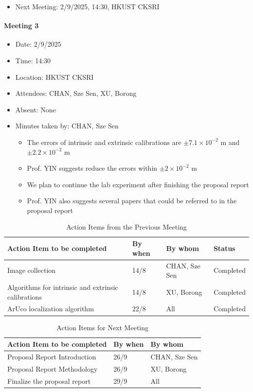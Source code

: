 \documentclass[11pt]{article}
\begin{document}
    \begin{itemize}
        \item Next Meeting: 2/9/2025, 14:30, HKUST CKSRI
    \end{itemize}
    \newpage
    \paragraph{Meeting 3}
    \begin{itemize}
        \item Date: 2/9/2025
        \item Time: 14:30
        \item Location: HKUST CKSRI
        \item Attendees: CHAN, Sze Sen, XU, Borong
        \item Absent: None
        \item Minutes taken by: CHAN, Sze Sen
        \begin{itemize}
            \item The errors of intrinsic and extrinsic calibrations are $\pm 7.1\times 10^ {- 2} $ m and $\pm 2.2\times 10^ {- 2} $ m
            \item Prof. YIN suggests reduce the errors within $\pm2\times 10^ {- 2} $ m
            \item We plan to continue the lab experiment after finishing the proposal report
            \item Prof. YIN also suggests several papers that could be referred to in the proposal report
        \end{itemize}
    \end{itemize}
    \begin{longtable}[c]{| l | l | l | l |}
        \caption{Action Items from the Previous Meeting\label{previous meeting 3}}\\ 
        \hline
        \textbf{Action Item to be completed} & \textbf{By when} & \textbf{By whom} & \textbf{Status}\\
        \hline
        Image collection & 14/8 & CHAN, Sze Sen & Completed\\
        \hline
        Algorithms for intrinsic and extrinsic calibrations & 14/8 & XU, Borong & Completed\\
        \hline
        ArUco localization algorithm & 22/8 & All & Completed\\
        \hline
    \end{longtable}
    \begin{longtable}[c]{| l | l | l |}
        \caption{Action Items for Next Meeting\label{next meeting 3}}\\ 
        \hline
        \textbf{Action Item to be completed} & \textbf{By when} & \textbf{By whom}\\
        \hline
        Proposal Report Introduction & 26/9 & CHAN, Sze Sen\\
        \hline
        Proposal Report Methodology & 26/9 & XU, Borong\\
        \hline
        Finalize the proposal report & 29/9 & All\\
        \hline
    \end{longtable}
\end{document}
